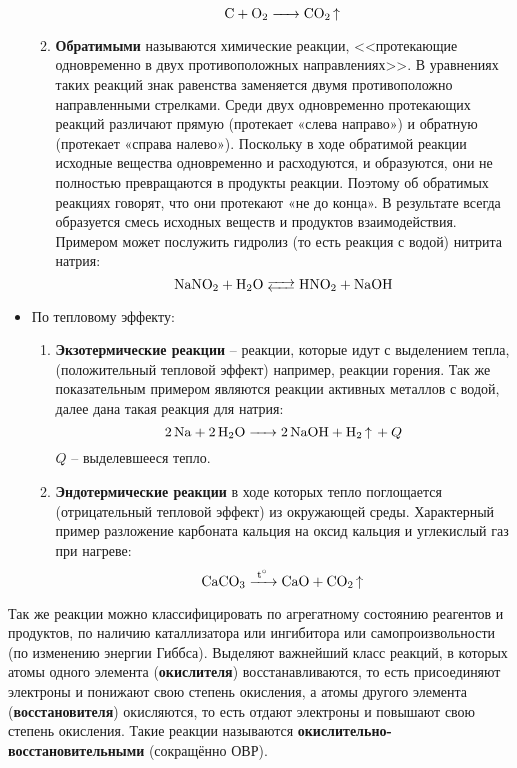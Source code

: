 \begin{itemize}
\begin{enumerate}
        \begin{equation*}
            \ce{C + O2 -> CO2 ^}
        \end{equation*}
        \item \textbf{Обратимыми} называются химические реакции, <<протекающие одновременно в двух противоположных направлениях>>. В уравнениях таких реакций знак равенства заменяется двумя противоположно направленными стрелками. Среди двух одновременно протекающих реакций различают прямую (протекает «слева направо») и обратную (протекает «справа налево»). Поскольку в ходе обратимой реакции исходные вещества одновременно и расходуются, и образуются, они не полностью превращаются в продукты реакции. Поэтому об обратимых реакциях говорят, что они протекают «не до конца». В результате всегда образуется смесь исходных веществ и продуктов взаимодействия. Примером может послужить гидролиз (то есть реакция с водой) нитрита натрия:
        \begin{equation*}
            \ce{NaNO2 + H2O <--> HNO2 + NaOH}
        \end{equation*}
    \end{enumerate}
    \item По тепловому эффекту:
    \begin{enumerate}
        \item \textbf{Экзотермические реакции} -- реакции, которые идут с выделением тепла, (положительный тепловой эффект) например, реакции горения. Так же показательным примером являются реакции активных металлов с водой, далее дана такая реакция для натрия:
        \begin{equation*}
            \ce{2Na + 2H2O -> 2NaOH + H_{2} ^} + Q
        \end{equation*}
        $Q$ -- выделевшееся тепло.
        \item \textbf{Эндотермические реакции} в ходе которых тепло поглощается (отрицательный тепловой эффект) из окружающей среды. Характерный пример разложение карбоната кальция на оксид кальция и углекислый газ при нагреве:
        \begin{equation*}
            \ce{CaCO3 ->[t^{\circ}] CaO + CO2 ^}
        \end{equation*}
        \end{enumerate}
\end{itemize}
Так же реакции можно классифицировать по агрегатному состоянию реагентов и продуктов, по наличию каталлизатора или ингибитора или самопроизвольности (по изменению энергии Гиббса). Выделяют важнейший класс реакций, в которых атомы одного элемента (\textbf{окислителя}) восстанавливаются, то есть присоединяют электроны и понижают свою степень окисления, а атомы другого элемента (\textbf{восстановителя}) окисляются, то есть отдают электроны и повышают свою степень окисления. Такие реакции называются \textbf{окислительно-восстановительными} (сокращённо ОВР).
